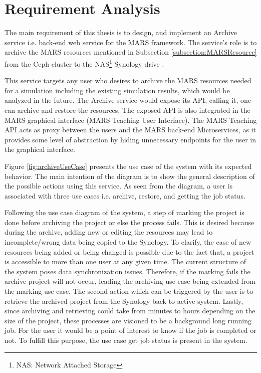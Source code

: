 \newpage
\chapter{Requirement Analysis}
\label{chap:ReqAnalysis}
 The main requirement of this thesis is to design, and implement an Archive service i.e. back-end web service for the MARS framework. The service's role is to
 archive the MARS resources mentioned in Subsection \ref{subsection:MARSResource} from the Ceph cluster \cite{Ceph} to the 
 NAS\footnote{NAS: Network Attached Storage} Synology drive \cite{Synology}.

 This service targets any user who desires to archive the MARS resources needed for a simulation including the existing simulation results, which would
 be analyzed in the future. The Archive service would expose its API, calling it, one can archive and restore the resources. The exposed
 API is also integrated in the MARS graphical interface (MARS Teaching User Interface). The MARS Teaching API acts as proxy between the users 
 and the MARS back-end Microservices, as it provides some level of abstraction by hiding unnecessary endpoints for the user in the graphical interface.

 Figure \ref{fig:archiveUseCase} presents the use case of the system with its expected behavior. The main intention of the diagram is to show the
 general description of the possible actions using this service. As seen from the diagram, a user is associated with three use cases i.e. archive, restore,
 and getting the job status. 

 Following the use case diagram of the system, a step of marking the project is done before archiving the project or else the process fails. This is desired because 
 during the archive, adding new or editing the resources may lead to incomplete/wrong data being copied to the Synology. To clarify, the case of new resources being
 added or being changed is possible due to the fact that, a project is accessible to more than one user at any given time. The current structure of the system
 poses data synchronization issues. Therefore, if the marking fails the archive project will not occur, leading the archiving use case being extended from the marking
 use case. The second action which can be triggered by the user is to retrieve the archived project from the Synology back to active system. Lastly, since archiving 
 and retrieving could take from minutes to hours depending on the size of the project, these processes are visioned to be a background long running job. For the user
 it would be a point of interest to know if the job is completed or not. To fulfill this purpose, the use case get job status is present in the system.
 
